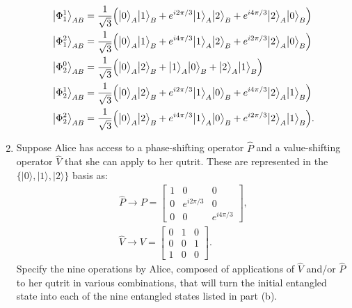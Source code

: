 \documentclass[10pt,letterpaper,boxed,cm]{hmcpset}
\newcommand{\ket}[1]{\big\lvert #1\big\rangle}
\begin{document}
\begin{problem}[2.]
\begin{enumerate}[label=(\alph*)]
\begin{align}
            \ket{\Phi^1_1}_{AB} &= \frac{1}{\sqrt{3}}\Bigl(\ket{0}_A\ket{1}_B + e^{i2\pi/3}\ket{1}_A\ket{2}_B + e^{i4\pi/3}\ket{2}_A\ket{0}_B\Bigr) \nonumber \\
            \ket{\Phi^2_1}_{AB} &= \frac{1}{\sqrt{3}}\Bigl(\ket{0}_A\ket{1}_B + e^{i4\pi/3}\ket{1}_A\ket{2}_B + e^{i2\pi/3}\ket{2}_A\ket{0}_B\Bigr) \nonumber \\
            \ket{\Phi^0_2}_{AB} &= \frac{1}{\sqrt{3}}\Bigl(\ket{0}_A\ket{2}_B + \ket{1}_A\ket{0}_B + \ket{2}_A\ket{1}_B\Bigr) \nonumber \\
            \ket{\Phi^1_2}_{AB} &= \frac{1}{\sqrt{3}}\Bigl(\ket{0}_A\ket{2}_B + e^{i2\pi/3}\ket{1}_A\ket{0}_B + e^{i4\pi/3}\ket{2}_A\ket{1}_B\Bigr) \nonumber \\
            \ket{\Phi^2_2}_{AB} &= \frac{1}{\sqrt{3}}\Bigl(\ket{0}_A\ket{2}_B + e^{i4\pi/3}\ket{1}_A\ket{0}_B + e^{i2\pi/3}\ket{2}_A\ket{1}_B\Bigr). \nonumber
        \end{align}
        \item Suppose Alice has access to a phase-shifting operator $\hat{P}$ and a value-shifting operator $\hat{V}$ that she can apply to her qutrit.  These are represented in the $\{\ket{0},\ket{1},\ket{2}\}$ basis as:
        \begin{align}
            \hat{P} \rightarrow P = \begin{bmatrix} 1 & 0 & 0 \\ 0 & e^{i2\pi/3} & 0 \\ 0 & 0 & e^{i4\pi/3} \end{bmatrix}, \nonumber \\
            \hat{V} \rightarrow V = \begin{bmatrix} 0 & 1 & 0 \\ 0 & 0 & 1 \\ 1 & 0 & 0 \end{bmatrix}. \nonumber
        \end{align}
        Specify the nine operations by Alice, composed of applications of $\hat{V}$ and/or $\hat{P}$ to her qutrit in various combinations, that will turn the initial entangled state into each of the nine entangled states listed in part (b).
    \end{enumerate}
\end{problem}

\newpage
\begin{solution}
    ~
    \vfill
\end{solution}
\newpage
\end{document}
